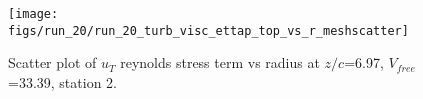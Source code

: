 \begin{figure}[H]
\centering
\texttt{[image: figs/run\_20/run\_20\_turb\_visc\_ettap\_top\_vs\_r\_meshscatter]}
\caption{Scatter plot of $
u_T$ reynolds stress term vs radius at $z/c$=6.97, $V_{free}$=33.39, station 2.}
\label{fig:run_20_turb_visc_ettap_top_vs_r_meshscatter}
\end{figure}


